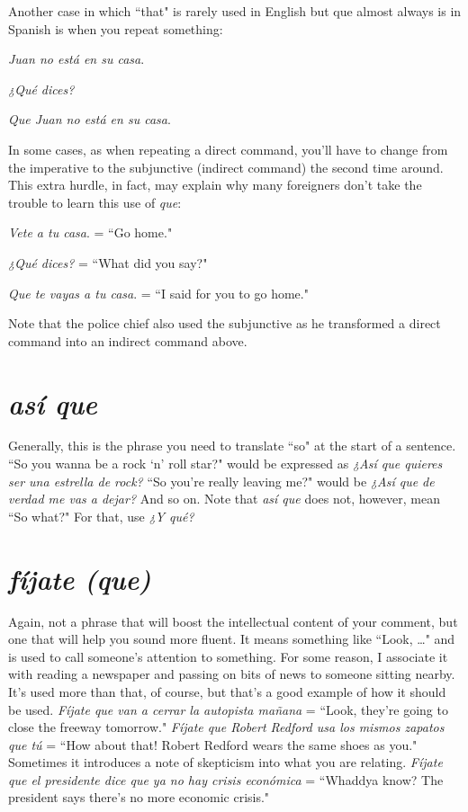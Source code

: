 Another case in which ``that" is rarely used in English but que
almost always is in Spanish is when you repeat something:

\bsk

\indu \emph{Juan no está en su casa}.

\indu \emph{¿Qué dices?}

\indu \emph{Que Juan no está en su casa}.

\bsk

In some cases, as when repeating a direct command, you'll have to
change from the imperative to the subjunctive (indirect command) the
second time around. This extra hurdle, in fact, may explain why many
foreigners don't take the trouble to learn this use of \emph{que}:

\bsk

\indu \emph{Vete a tu casa}. = ``Go home."

\indu \emph{¿Qué dices?} = ``What did you say?"

\indu \emph{Que te vayas a tu casa}. = ``I said for you to go home."

\bsk

Note that the police chief also used the subjunctive as he transformed
a direct command into an indirect command above.

\section{\emph{así que}}

Generally, this is the phrase you need to translate ``so" at the
start of a sentence. ``So you wanna be a rock `n' roll star?" would be
expressed as \emph{¿Así que quieres ser una estrella de rock?} ``So you're
really leaving me?" would be \emph{¿Así que de verdad me vas a dejar?} And
so on. Note that \emph{así que} does not, however, mean ``So what?" For that,
use \emph{¿Y qué?}

\section{\emph{fíjate (que)}}

Again, not a phrase that will boost the intellectual content of
your comment, but one that will help you sound more fluent. It means
something like ``Look, \ldots{}" and is used to call someone's attention to
something. For some reason, I associate it with reading a newspaper
and passing on bits of news to someone sitting nearby. It's used more
than that, of course, but that's a good example of how it should be
used. \emph{Fíjate que van a cerrar la autopista mañana} = ``Look, they're
going to close the freeway tomorrow." \emph{Fíjate que Robert Redford usa
los mismos zapatos que tú} = ``How about that! Robert Redford wears
the same shoes as you." Sometimes it introduces a note of skepticism
into what you are relating. \emph{Fíjate que el presidente dice que ya no hay
crisis económica} = ``Whaddya know? The president says there's no
more economic crisis."

